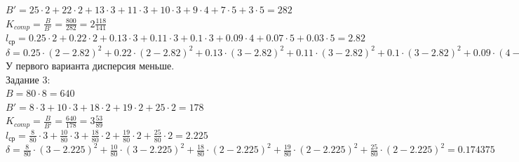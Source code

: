 \documentclass[a4paper,14pt]{extarticle}
\begin{document}
$B' = 25 \cdot 2 + 22 \cdot 2 + 13 \cdot 3 + 11 \cdot 3 + 10 \cdot 3 + 9 \cdot 4 + 7 \cdot 5 + 3 \cdot 5 = 282$\\
$K_{comp} = \frac{B}{B'} = \frac{800}{282} = 2\frac{118}{141}$\\
$l_{ср} = 0.25 \cdot 2 + 0.22 \cdot 2 + 0.13 \cdot 3 + 0.11 \cdot 3 + 0.1 \cdot 3 + 0.09 \cdot 4 + 0.07 \cdot 5 + 0.03 \cdot 5 = 2.82$\\
$\delta = 0.25 \cdot (2 - 2.82)^2 + 0.22 \cdot (2 - 2.82)^2 + 0.13 \cdot (3 - 2.82)^2 + 0.11 \cdot (3 - 2.82)^2 + 0.1 \cdot (3 - 2.82)^2 + 0.09 \cdot (4 - 2.82)^2 + 0.07 \cdot (5 - 2.82)^2 + 0.03 \cdot (5 - 2.82)^2 = 0.9276$\\

У первого варианта дисперсия меньше.\\

Задание 3:\\
$B = 80 \cdot 8 = 640$\\
$B' = 8 \cdot 3 + 10 \cdot 3 + 18 \cdot 2 + 19 \cdot 2 + 25 \cdot 2 = 178$\\
$K_{comp} = \frac{B}{B'} = \frac{640}{178} = 3\frac{53}{89}$\\
$l_{ср} = \frac{8}{80} \cdot 3 + \frac{10}{80} \cdot 3 + \frac{18}{80} \cdot 2 + \frac{19}{80} \cdot 2 + \frac{25}{80} \cdot 2 = 2.225$\\
$\delta = \frac{8}{80} \cdot (3 - 2.225)^2 + \frac{10}{80} \cdot (3 - 2.225)^2 + \frac{18}{80} \cdot (2 - 2.225)^2 + \frac{19}{80} \cdot (2 - 2.225)^2 + \frac{25}{80} \cdot (2 - 2.225)^2 = 0.174375$\\
\end{document}
